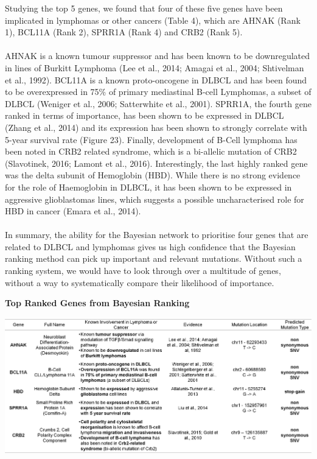 \documentclass{article}
\begin{document}
Studying the top 5 genes, we found that four of these five genes have been implicated in lymphomas or other cancers (Table 4), which are AHNAK (Rank 1), BCL11A (Rank 2), SPRR1A (Rank 4) and CRB2 (Rank 5). \\\\  AHNAK is a known tumour suppressor and has been known to be downregulated in lines of Burkitt Lymphoma (Lee et al., 2014; Amagai et al., 2004; Shtivelman et al., 1992). BCL11A is a known proto-oncogene in DLBCL and has been found to be overexpressed in 75\% of primary mediastinal B-cell Lymphomas, a subset of DLBCL (Weniger et al., 2006; Satterwhite et al., 2001). SPRR1A, the fourth gene ranked in terms of importance, has been shown to be expressed in DLBCL (Zhang et al., 2014) and its expression has been shown to strongly correlate with 5-year survival rate (Figure 23). Finally, development of B-Cell lymphoma has been noted in CRB2 related syndrome, which is a bi-allelic mutation of CRB2 (Slavotinek, 2016; Lamont et al., 2016). Interestingly, the last highly ranked gene was the delta subunit of Hemoglobin (HBD). While there is no strong evidence for the role of Haemoglobin in DLBCL, it has been shown to be expressed in aggressive glioblastomas lines, which suggests a possible uncharacterised role for HBD in cancer (Emara et al., 2014). \\\\ In summary, the ability for the Bayesian network to prioritise four genes that are related to DLBCL and lymphomas gives us high confidence that the Bayesian ranking method can pick up important and relevant mutations. Without such a ranking system, we would have to look through over a multitude of genes, without a way to systematically compare their likelihood of importance. 
 
\begin{table}[H]
\caption{\textbf{Top Ranked Genes from Bayesian Ranking}}
\includegraphics[width=\textwidth]{top5importantgenes.png}
\centering
\end{table}
\end{document}
